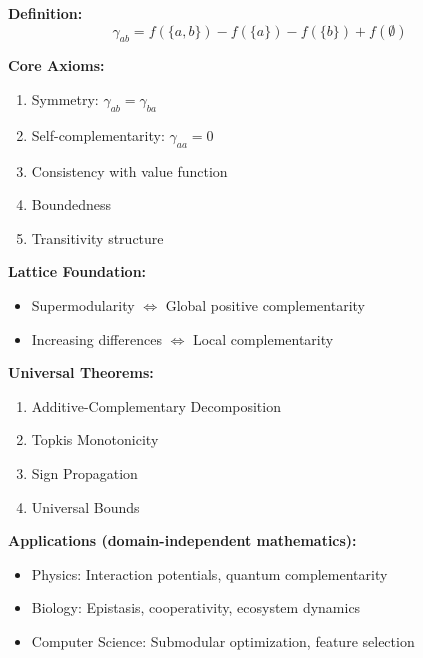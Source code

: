 \begin{tcolorbox}[colback=gray!5!white,colframe=gray!75!black,title=\textbf{Summary: Mathematical Foundations of Complementarity}]

\textbf{Definition:}
\begin{equation}
\gamma_{ab} = f(\{a, b\}) - f(\{a\}) - f(\{b\}) + f(\emptyset)
\end{equation}

\textbf{Core Axioms:}
\begin{enumerate}[noitemsep]
    \item Symmetry: $\gamma_{ab} = \gamma_{ba}$
    \item Self-complementarity: $\gamma_{aa} = 0$
    \item Consistency with value function
    \item Boundedness
    \item Transitivity structure
\end{enumerate}

\textbf{Lattice Foundation:}
\begin{itemize}[noitemsep]
    \item Supermodularity $\Leftrightarrow$ Global positive complementarity
    \item Increasing differences $\Leftrightarrow$ Local complementarity
\end{itemize}

\textbf{Universal Theorems:}
\begin{enumerate}[noitemsep]
    \item Additive-Complementary Decomposition
    \item Topkis Monotonicity
    \item Sign Propagation
    \item Universal Bounds
\end{enumerate}

\textbf{Applications (domain-independent mathematics):}
\begin{itemize}[noitemsep]
    \item Physics: Interaction potentials, quantum complementarity
    \item Biology: Epistasis, cooperativity, ecosystem dynamics
    \item Computer Science: Submodular optimization, feature selection
\end{itemize}

\end{tcolorbox}

